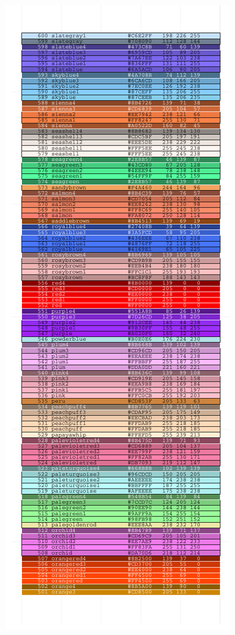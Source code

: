 \documentclass[letterpaper]{article}
\begin{document}
\begin{center}
\begin{figure}[ht]
\begin{minipage}[b]{0.5\linewidth}
\includegraphics{ggplotCheatSheet-010}
\end{minipage}
\end{figure}

\end{center}
\end{document}
